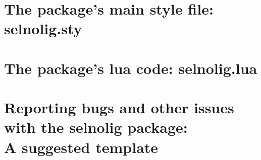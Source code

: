 \documentclass[11pt]{article}
\newcommand{\pkg}[1]{\textsf{#1}}
\begin{document}
\bigskip

\begin{multicols}{2}
\end{multicols}

\clearpage
\section[The package's main style file: selnolig.sty]
{The package's main style file: \pkg{selnolig.sty}}


\clearpage
\section[The package's lua code: selnolig.lua]{The package's lua code: \pkg{selnolig.lua}}
\label{sec:luacode}



\clearpage
\section[Reporting bugs and other issues with the selnolig package: A suggested template]{Reporting bugs and other issues with the \pkg{selnolig} package:\\A suggested template} \label{sec:template}

\end{document}
